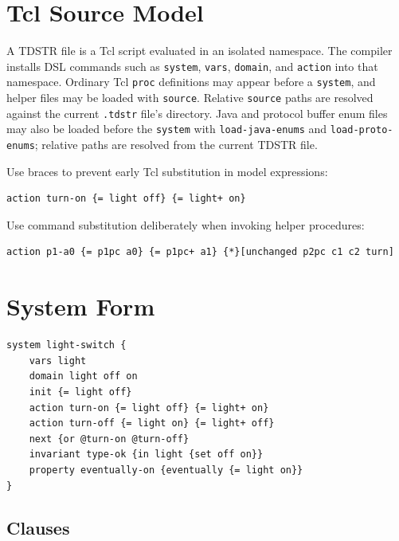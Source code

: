 \documentclass[11pt]{article}
\begin{document}
\section{Tcl Source Model}

A TDSTR file is a Tcl script evaluated in an isolated namespace.  The compiler
installs DSL commands such as \texttt{system}, \texttt{vars}, \texttt{domain},
and \texttt{action} into that namespace.  Ordinary Tcl \texttt{proc}
definitions may appear before a \texttt{system}, and helper files may be loaded
with \texttt{source}.  Relative \texttt{source} paths are resolved against the
current \texttt{.tdstr} file's directory.  Java and protocol buffer enum files
may also be loaded before the \texttt{system} with \texttt{load-java-enums} and
\texttt{load-proto-enums}; relative paths are resolved from the current TDSTR
file.

Use braces to prevent early Tcl substitution in model expressions:

\begin{lstlisting}[language=TDSTR]
action turn-on {= light off} {= light+ on}
\end{lstlisting}

Use command substitution deliberately when invoking helper procedures:

\begin{lstlisting}[language=TDSTR]
action p1-a0 {= p1pc a0} {= p1pc+ a1} {*}[unchanged p2pc c1 c2 turn]
\end{lstlisting}

\section{System Form}

\begin{lstlisting}[language=TDSTR]
system light-switch {
    vars light
    domain light off on
    init {= light off}
    action turn-on {= light off} {= light+ on}
    action turn-off {= light on} {= light+ off}
    next {or @turn-on @turn-off}
    invariant type-ok {in light {set off on}}
    property eventually-on {eventually {= light on}}
}
\end{lstlisting}

\subsection{Clauses}
\end{document}
